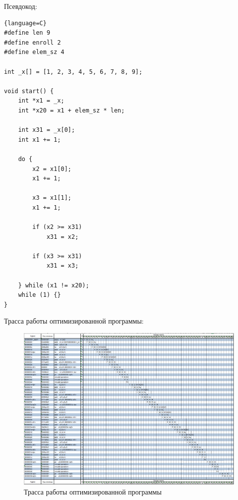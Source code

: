 Псевдокод:
\begin{lstlisting}{language=C}
#define len 9
#define enroll 2
#define elem_sz 4

int _x[] = [1, 2, 3, 4, 5, 6, 7, 8, 9];

void start() {
    int *x1 = _x;
    int *x20 = x1 + elem_sz * len;

    int x31 = _x[0];
    int x1 += 1;

    do {
        x2 = x1[0];
        x1 += 1;

        x3 = x1[1];
        x1 += 1;

        if (x2 >= x31)
            x31 = x2;
        
        if (x3 >= x31)
            x31 = x3;
        
    } while (x1 != x20);
    while (1) {}
}
\end{lstlisting}

\clearpage

Трасса работы оптимизированной программы:
\begin{figure}[ht!]
    \centering
    \includegraphics[width=170mm]{./img/trasa_opt.png}
    \caption{Трасса работы оптимизированной программы\label{overflow}}
\end{figure}
